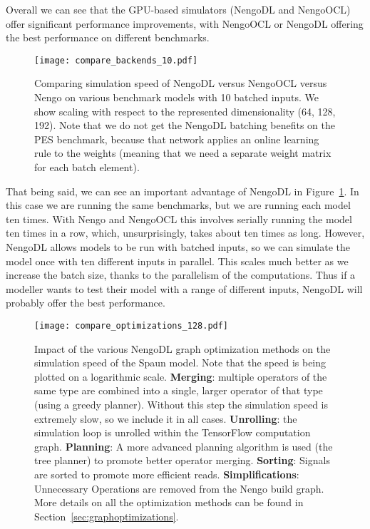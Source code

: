 \documentclass{article}
\begin{document}
Overall we can see that the GPU-based simulators (NengoDL and NengoOCL) offer significant performance improvements, with NengoOCL or NengoDL offering the best performance on different benchmarks.

\begin{figure}
\centering
\texttt{[image: compare\_backends\_10.pdf]}
\caption{Comparing simulation speed of NengoDL versus NengoOCL versus Nengo on various benchmark models with 10 batched inputs.  We show scaling with respect to the represented dimensionality (64, 128, 192).  Note that we do not get the NengoDL batching benefits on the PES benchmark, because that network applies an online learning rule to the weights (meaning that we need a separate weight matrix for each batch element).}
\label{fig:compare_backends_10}
\end{figure}

That being said, we can see an important advantage of NengoDL in Figure~\ref{fig:compare_backends_10}.  In this case we are running the same benchmarks, but we are running each model ten times.  With Nengo and NengoOCL this involves serially running the model ten times in a row, which, unsurprisingly, takes about ten times as long.  However, NengoDL allows models to be run with batched inputs, so we can simulate the model once with ten different inputs in parallel.  This scales much better as we increase the batch size, thanks to the parallelism of the computations.  Thus if a modeller wants to test their model with a range of different inputs, NengoDL will probably offer the best performance.

\begin{figure}
\centering
\texttt{[image: compare\_optimizations\_128.pdf]}
\caption{Impact of the various NengoDL graph optimization methods on the simulation speed of the Spaun model.  Note that the speed is being plotted on a logarithmic scale.  {\bf Merging}: multiple operators of the same type are combined into a single, larger operator of that type (using a greedy planner).  Without this step the simulation speed is extremely slow, so we include it in all cases.  {\bf Unrolling}: the simulation loop is unrolled within the TensorFlow computation graph.  {\bf Planning}: A more advanced planning algorithm is used (the tree planner) to promote better operator merging.  {\bf Sorting}: Signals are sorted to promote more efficient reads.  {\bf Simplifications}: Unnecessary Operations are removed from the Nengo build graph.  More details on all the optimization methods can be found in Section~\ref{sec:graphoptimizations}.}
\label{fig:compare_optimizations}
\end{figure}
\end{document}
